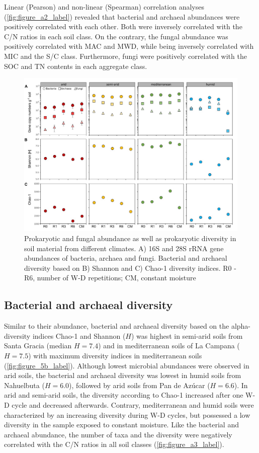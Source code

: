 Linear (Pearson) and non-linear (Spearman) correlation analyses (\cref{fig:figure_a2_label}) revealed that bacterial and archaeal abundances were positively correlated with each other. 
Both were inversely correlated with the C/N ratios in each soil class. 
On the contrary, the fungal abundance was positively correlated with MAC and MWD, while being inversely correlated with MIC and the S/C class. 
Furthermore, fungi were positively correlated with the SOC and TN contents in each aggregate class.

\begin{figure}[H]
	\centering
	\includegraphics[width=1\textwidth]{img/M4-Figure_5.jpg}
	\caption{Prokaryotic and fungal abundance as well as prokaryotic diversity in soil material from different climates. A) 16S and 28S rRNA gene abundances of bacteria, archaea and fungi. Bacterial and archaeal diversity based on B) Shannon and C) Chao-1 diversity indices. R0 - R6, number of W-D repetitions; CM, constant moisture}
	\label{fig:M4-F5}
\end{figure}

\subsection{Bacterial and archaeal diversity}

Similar to their abundance, bacterial and archaeal diversity based on the alpha-diversity indices Chao-1 and Shannon (\(H\)) was highest in semi-arid soils from Santa Gracia (median \(H = 7.4\)) and in mediterranean soils of La Campana (\(H = 7.5\)) with maximum diversity indices in mediterranean soils (\cref{fig:figure_5b_label}). 
Although lowest microbial abundances were observed in arid soils, the bacterial and archaeal diversity was lowest in humid soils from Nahuelbuta (\(H = 6.0\)), followed by arid soils from Pan de Az{\'u}car (\(H = 6.6\)). 
In arid and semi-arid soils, the diversity according to Chao-1 increased after one W-D cycle and decreased afterwards. 
Contrary, mediterranean and humid soils were characterized by an increasing diversity during W-D cycles, but possessed a low diversity in the sample exposed to constant moisture. 
Like the bacterial and archaeal abundance, the number of taxa and the diversity were negatively correlated with the C/N ratios in all soil classes (\cref{fig:figure_a3_label}).

